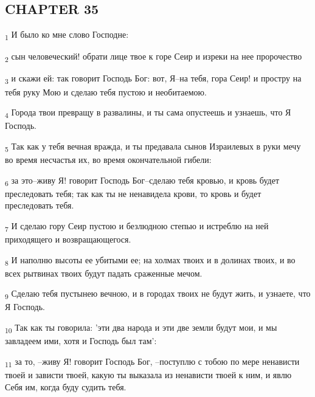 \subsection{CHAPTER 35}
\begin{tcolorbox}
\textsubscript{1} И было ко мне слово Господне:
\end{tcolorbox}
\begin{tcolorbox}
\textsubscript{2} сын человеческий! обрати лице твое к горе Сеир и изреки на нее пророчество
\end{tcolorbox}
\begin{tcolorbox}
\textsubscript{3} и скажи ей: так говорит Господь Бог: вот, Я--на тебя, гора Сеир! и простру на тебя руку Мою и сделаю тебя пустою и необитаемою.
\end{tcolorbox}
\begin{tcolorbox}
\textsubscript{4} Города твои превращу в развалины, и ты сама опустеешь и узнаешь, что Я Господь.
\end{tcolorbox}
\begin{tcolorbox}
\textsubscript{5} Так как у тебя вечная вражда, и ты предавала сынов Израилевых в руки мечу во время несчастья их, во время окончательной гибели:
\end{tcolorbox}
\begin{tcolorbox}
\textsubscript{6} за это--живу Я! говорит Господь Бог--сделаю тебя кровью, и кровь будет преследовать тебя; так как ты не ненавидела крови, то кровь и будет преследовать тебя.
\end{tcolorbox}
\begin{tcolorbox}
\textsubscript{7} И сделаю гору Сеир пустою и безлюдною степью и истреблю на ней приходящего и возвращающегося.
\end{tcolorbox}
\begin{tcolorbox}
\textsubscript{8} И наполню высоты ее убитыми ее; на холмах твоих и в долинах твоих, и во всех рытвинах твоих будут падать сраженные мечом.
\end{tcolorbox}
\begin{tcolorbox}
\textsubscript{9} Сделаю тебя пустынею вечною, и в городах твоих не будут жить, и узнаете, что Я Господь.
\end{tcolorbox}
\begin{tcolorbox}
\textsubscript{10} Так как ты говорила: 'эти два народа и эти две земли будут мои, и мы завладеем ими, хотя и Господь был там':
\end{tcolorbox}
\begin{tcolorbox}
\textsubscript{11} за то, --живу Я! говорит Господь Бог, --поступлю с тобою по мере ненависти твоей и зависти твоей, какую ты выказала из ненависти твоей к ним, и явлю Себя им, когда буду судить тебя.
\end{tcolorbox}
